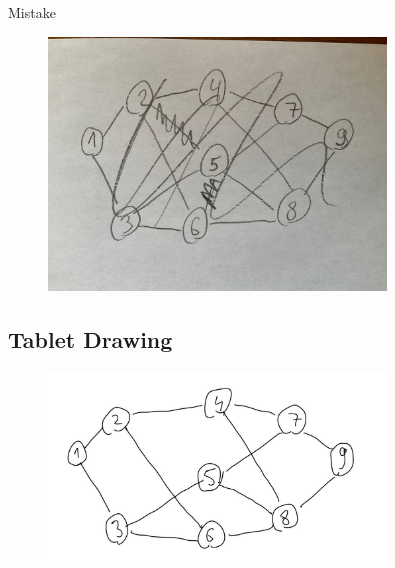 \documentclass[11pt]{beamer}
\begin{document}
\begin{frame}{\subsecname}{Mistake}
    \begin{figure}
        \centering
        \includegraphics[width=0.8\textwidth]{figures/hand3.jpg}
    \end{figure}
\end{frame}

\subsection{Tablet Drawing}
\begin{frame}{\subsecname}
    \begin{figure}
        \centering
        \includegraphics[width=0.8\textwidth]{figures/tablet.jpg}
    \end{figure}
\end{frame}
\end{document}
